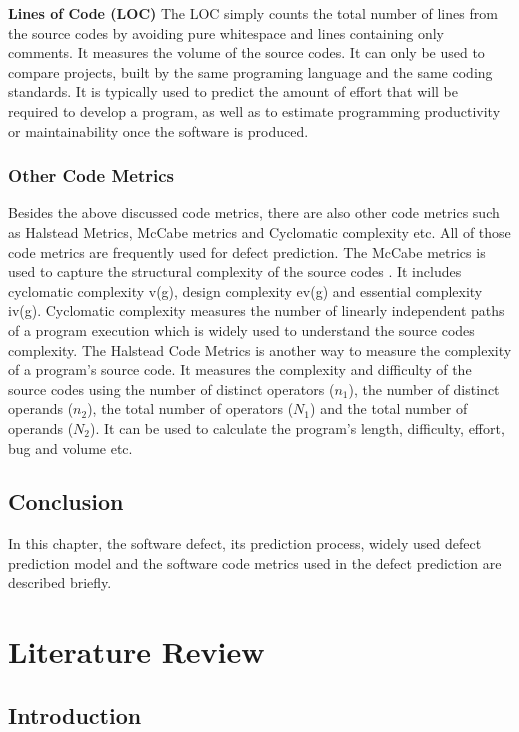 \documentclass[12pt]{report}
\begin{document}
\textbf{Lines of Code (LOC)}
The LOC simply counts the total number of lines from the source codes by avoiding pure whitespace and lines containing only comments. It measures the volume of the source codes. It can only be used to compare projects, built by the same programing language and the same coding standards. It is typically used to predict the amount of effort that will be required to develop a program, as well as to estimate programming productivity or maintainability once the software is produced.


\subsection{Other Code Metrics}
Besides the above discussed code metrics, there are also other code metrics such as Halstead Metrics, McCabe metrics and Cyclomatic complexity etc. All of those code metrics are frequently used for defect prediction. The McCabe metrics is used to capture the structural complexity of the source codes \cite{mccabe1976complexity}. It includes cyclomatic complexity v(g), design complexity ev(g) and essential complexity iv(g). Cyclomatic complexity measures the number of linearly independent paths of a program execution which is widely used to understand the source codes complexity. The Halstead Code Metrics \cite{halstead1977elements} is another way to measure the complexity of a program's source code. It measures the complexity and difficulty of the source codes using the number of distinct operators ($n_{1}$), the number of distinct operands ($n_{2}$), the total number of operators ($N_{1}$) and the total number of operands ($N_{2}$). It can be used to calculate the program's length, difficulty, effort, bug and volume etc. 

\section{Conclusion}
In this chapter, the software defect, its prediction process, widely used defect prediction model and the software code metrics used in the defect prediction are described briefly.  
\chapter{Literature Review}
\section{Introduction}
\end{document}

